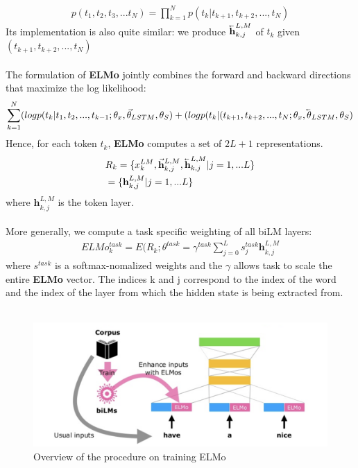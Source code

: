 \documentclass[paper=a4, fontsize=12pt]{scrartcl}
\newcommand{\cev}[1]{\reflectbox{\ensuremath{\vec{\reflectbox{\ensuremath{#1}}}}}}
\begin{document}
\begin{align*}
p(t_1, t_2, t_3, ... t_N) = \prod^N_{k = 1} p(t_k | t_{k+1}, t_{k+2}, ... ,t_N)
\end{align*}
Its implementation is also quite similar: we produce $\cev{\mathbf{h}}^{L, M}_{k, j}$ of $t_k$ given $(t_{k+1}, t_{k+2}, ... ,t_N)$\\\\
The formulation of \textbf{ELMo} jointly combines the forward and backward directions that maximize the log likelihood: 
\begin{align*}
\sum^N_{k=1} (logp (t_k | t_1, t_2, ..., t_{k-1}; \theta_x, \vec{\theta}_{LSTM}, \theta_{S}) + 
(logp (t_k | (t_{k+1}, t_{k+2}, ... ,t_N; \theta_x, \cev{\theta}_{LSTM}, \theta_{S})
\end{align*}
Hence, for each token $t_k$, \textbf{ELMo} computes a set of $2L+1$ representations. 
\begin{align*}
& R_k = \{x^{LM}_k, \vec{\mathbf{h}}^{L,M}_{k, j}, \cev{\mathbf{h}}^{L, M}_{k, j} | j = 1, ... L\} \\
& = \{ \mathbf{h}^{L, M}_{k, j} | j = 1, ... L\}
\end{align*}
where $\mathbf{h}^{L, M}_{k, j} $ is the token layer. \\\\
More generally, we compute a task specific weighting of all biLM layers:
\begin{align*}
ELMo^{task}_k = E(R_k ; \theta^{task} = \gamma^{task} \sum^{L}_{j=0} s^{task}_j \mathbf{h}^{L, M}_{k, j} 
\end{align*}
where $s^{task}$ is a softmax-nomalized weights and the $\gamma$ allows task to scale the entire \textbf{ELMo} vector. The indices k and j correspond to the index of the word and the index of the layer from which the hidden state is being extracted from.\\\\
 \begin{figure}
  \includegraphics[scale=0.7]{elmoprocee.png}
  \caption{Overview of the procedure on training ELMo}
  \label{fig:skip-gram}
\end{figure}
\end{document}
